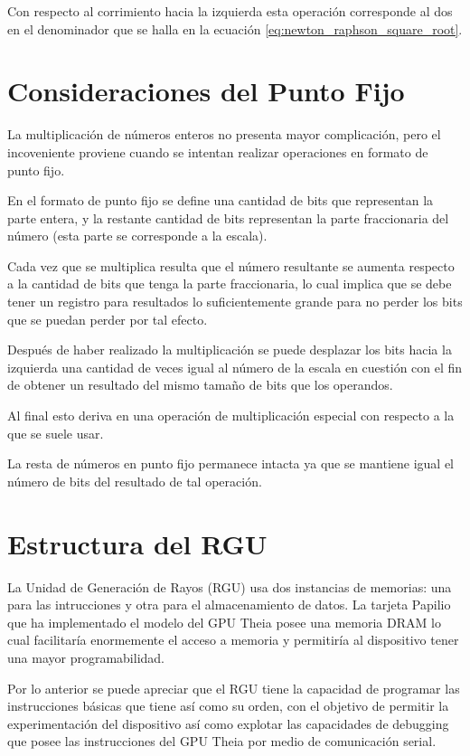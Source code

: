 Con respecto al corrimiento hacia la izquierda esta operación corresponde al dos en el denominador que se halla en la ecuación \eqref{eq:newton_raphson_square_root}.


\section{Consideraciones del Punto Fijo}

La multiplicación de números enteros no presenta mayor complicación, pero el incoveniente proviene cuando se intentan realizar operaciones en formato de punto fijo.

En el formato de punto fijo se define una cantidad de bits que representan la parte entera, y la restante cantidad de bits representan la parte fraccionaria del número (esta parte se corresponde a la escala).

Cada vez que se multiplica resulta que el número resultante se aumenta respecto a la cantidad de bits que tenga la parte fraccionaria, lo cual implica que se debe tener un registro para resultados lo suficientemente grande para no perder los bits que se puedan perder por tal efecto.

Después de haber realizado la multiplicación se puede desplazar los bits hacia la izquierda una cantidad de veces igual al número de la escala en cuestión con el fin de obtener un resultado del mismo tamaño de bits que los operandos.

Al final esto deriva en una operación de multiplicación especial con respecto a la que se suele usar.

La resta de números en punto fijo permanece intacta ya que se mantiene igual el número de bits del resultado de tal operación.

\section{Estructura del RGU}

La Unidad de Generación de Rayos (RGU) usa dos instancias de memorias: una para las intrucciones y otra para el almacenamiento de datos. La tarjeta Papilio que ha implementado el modelo del GPU Theia posee una memoria DRAM lo cual facilitaría enormemente el acceso a memoria y permitiría al dispositivo tener una mayor programabilidad.

Por lo anterior se puede apreciar que el RGU tiene la capacidad de programar las instrucciones básicas que tiene así como su orden, con el objetivo de permitir la experimentación del dispositivo así como explotar las capacidades de debugging que posee las instrucciones del GPU Theia por medio de comunicación serial.


